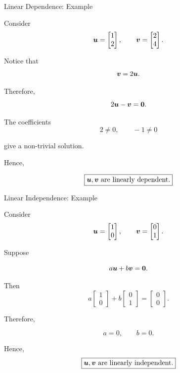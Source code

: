 \begin{frame}{Linear Dependence: Example}

Consider
\vspace{-0.1cm}
\[
\bm{u}
=
\begin{bmatrix}
1\\
2
\end{bmatrix},
\qquad
\bm{v}
=
\begin{bmatrix}
2\\
4
\end{bmatrix}.
\]

Notice that
\vspace{-0.1cm}
\[
\bm{v}=2\bm{u}.
\]

Therefore,
\vspace{-0.1cm}
\[
2\bm{u}-\bm{v}
=
\mathbf{0}.
\]

The coefficients
\vspace{-0.1cm}
\[
2\neq0,
\qquad
-1\neq0
\]

give a non-trivial solution.

Hence,

\[
\boxed{
\bm{u},\bm{v}
\text{ are linearly dependent.}
}
\]

\end{frame}



\begin{frame}{Linear Independence: Example}

Consider
\vspace{-0.1cm}
\[
\bm{u}
=
\begin{bmatrix}
1\\
0
\end{bmatrix},
\qquad
\bm{v}
=
\begin{bmatrix}
0\\
1
\end{bmatrix}.
\]

Suppose

\[
a\bm{u}+b\bm{v}
=
\mathbf{0}.
\]

Then
\vspace{-0.1cm}
\[
a
\begin{bmatrix}
1\\
0
\end{bmatrix}
+
b
\begin{bmatrix}
0\\
1
\end{bmatrix}
=
\begin{bmatrix}
0\\
0
\end{bmatrix}.
\]

Therefore,

\[
a=0,
\qquad
b=0.
\]

Hence,
\vspace{-0.1cm}
\[
\boxed{
\bm{u},\bm{v}
\text{ are linearly independent.}
}
\]

\end{frame}


